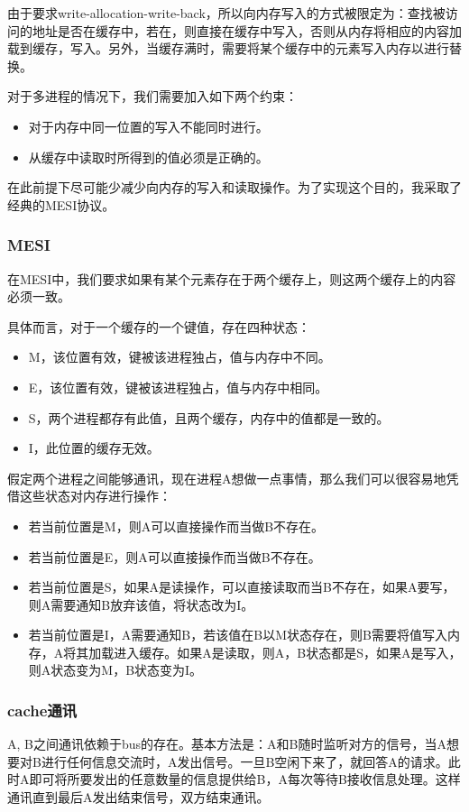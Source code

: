 \documentclass{article}
\theoremstyle{plain} \newtheorem{theorem}{常识}[section]
\theoremstyle{plain} \newtheorem{lizi}{例}[section]
\begin{document}
由于要求write-allocation-write-back，所以向内存写入的方式被限定为：查找被访问的地址是否在缓存中，若在，则直接在缓存中写入，否则从内存将相应的内容加载到缓存，写入。另外，当缓存满时，需要将某个缓存中的元素写入内存以进行替换。

对于多进程的情况下，我们需要加入如下两个约束：

\begin{itemize}
    \item 对于内存中同一位置的写入不能同时进行。
    \item 从缓存中读取时所得到的值必须是正确的。
\end{itemize}

在此前提下尽可能少减少向内存的写入和读取操作。为了实现这个目的，我采取了经典的MESI协议。

\subsubsection{MESI}
在MESI中，我们要求如果有某个元素存在于两个缓存上，则这两个缓存上的内容必须一致。

具体而言，对于一个缓存的一个键值，存在四种状态：

\begin{itemize}
    \item M，该位置有效，键被该进程独占，值与内存中不同。
    \item E，该位置有效，键被该进程独占，值与内存中相同。
    \item S，两个进程都存有此值，且两个缓存，内存中的值都是一致的。
    \item I，此位置的缓存无效。
\end{itemize}

假定两个进程之间能够通讯，现在进程A想做一点事情，那么我们可以很容易地凭借这些状态对内存进行操作：

\begin{itemize}
    \item 若当前位置是M，则A可以直接操作而当做B不存在。
    \item 若当前位置是E，则A可以直接操作而当做B不存在。
    \item 若当前位置是S，如果A是读操作，可以直接读取而当B不存在，如果A要写，则A需要通知B放弃该值，将状态改为I。
    \item 若当前位置是I，A需要通知B，若该值在B以M状态存在，则B需要将值写入内存，A将其加载进入缓存。如果A是读取，则A，B状态都是S，如果A是写入，则A状态变为M，B状态变为I。
\end{itemize}

\subsubsection{cache通讯}
A, B之间通讯依赖于bus的存在。基本方法是：A和B随时监听对方的信号，当A想要对B进行任何信息交流时，A发出信号。一旦B空闲下来了，就回答A的请求。此时A即可将所要发出的任意数量的信息提供给B，A每次等待B接收信息处理。这样通讯直到最后A发出结束信号，双方结束通讯。
\end{document}
